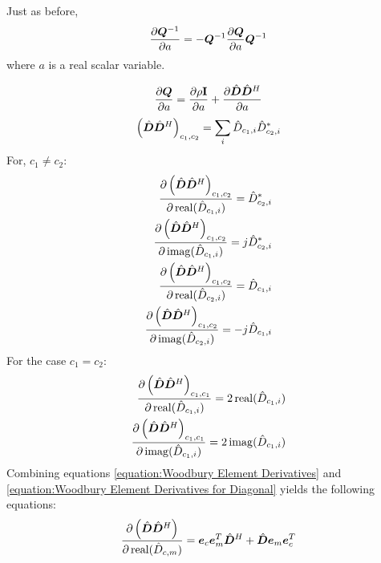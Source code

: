 \begin{appendices}
Just as before,
\begin{equation} \label{equation:Derivative of Woodbury Inverse}
\frac{\partial \bm{Q}^{-1}}{\partial a} = -\bm{Q}^{-1}\frac{\partial \bm{Q}}{\partial a}\bm{Q}^{-1}
\end{equation}
where $a$ is a real scalar variable.

\begin{equation}
\frac{\partial \bm{Q}}{\partial a} = \frac{\partial \rho{\bf I}}{\partial a} + \frac{\partial \hat{\bm{D}}\hat{\bm{D}}^H}{\partial a} 
\end{equation}
\begin{equation}
\left(\hat{\bm{D}}\hat{\bm{D}}^H\right)_{c_1,c_2} = \sum_i \hat{D}_{c_1,i}\hat{D}_{c_2,i}^*
\end{equation}
For, $c_1 \neq c_2$:
\begin{equation} \label{equation:Woodbury Element Derivatives}
\begin{split}
\frac{\partial \left(\hat{\bm{D}}\hat{\bm{D}}^H\right)_{c_1,c_2}}{\partial 
\operatorname{real}(\hat{D}_{c_1,i})} = \hat{D}_{c_2,i}^* 
\\
\frac{\partial \left(\hat{\bm{D}}\hat{\bm{D}}^H\right)_{c_1,c_2}}{\partial \operatorname{imag}(\hat{D}_{c_1,i})} = j\hat{D}_{c_2,i}^* 
\\
\frac{\partial \left(\hat{\bm{D}}\hat{\bm{D}}^H\right)_{c_1,c_2}}{\partial 
\operatorname{real}(\hat{D}_{c_2,i})} = \hat{D}_{c_1,i} 
\\
\frac{\partial \left(\hat{\bm{D}}\hat{\bm{D}}^H\right)_{c_1,c_2}}{\partial \operatorname{imag}(\hat{D}_{c_2,i})} = -j\hat{D}_{c_1,i} 
\end{split}
\end{equation}
For the case $c_1 = c_2$:
\begin{equation}
\begin{split} \label{equation:Woodbury Element Derivatives for Diagonal}
\frac{\partial \left(\hat{\bm{D}}\hat{\bm{D}}^H\right)_{c_1,c_1}}{\partial 
\operatorname{real}(\hat{D}_{c_1,i})} = 2
\operatorname{real}(\hat{D}_{c_1,i})
\\
\frac{\partial \left(\hat{\bm{D}}\hat{\bm{D}}^H\right)_{c_1,c_1}}{\partial \operatorname{imag}(\hat{D}_{c_1,i})} = 2\operatorname{imag}(\hat{D}_{c_1,i})
\end{split}
\end{equation}
Combining equations \ref{equation:Woodbury Element Derivatives} and \ref{equation:Woodbury Element Derivatives for Diagonal} yields the following equations:
\begin{equation}
\begin{split}
\frac{\partial \left(\hat{\mD}\hat{\mD}^H\right)}{\partial 
\real(\hat{D}_{c,m})} = \ve_c\ve_m^T\hat{\mD}^H + \hat{\mD}\ve_m\ve_c^T

\end{split}
\end{equation}
\end{appendices}
